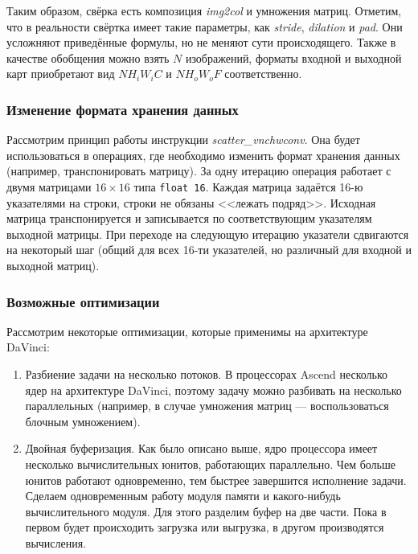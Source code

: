 Таким образом, свёрка есть композиция \textit{img2col} и умножения матриц.
Отметим, что в реальности свёртка имеет такие параметры, как
\textit{stride}, \textit{dilation} и \textit{pad}. Они усложняют
приведённые формулы, но не меняют сути происходящего. Также в
качестве обобщения можно взять $N$ изображений, форматы входной и
выходной карт приобретают вид $N H_i W_i C$ и $N H_o W_o F$ соответственно.

\subsubsection{Изменение формата хранения данных}

Рассмотрим принцип работы инструкции \textit{scatter\_vnchwconv}. Она будет
использоваться в операциях, где необходимо изменить формат хранения данных
(например, транспонировать матрицу). За одну итерацию операция работает с
двумя матрицами $16 \times 16$ типа \texttt{float 16}. Каждая матрица задаётся
16-ю указателями на строки, строки не обязаны <<лежать подряд>>. Исходная
матрица транспонируется и записывается по соответствующим указателям выходной
матрицы. При переходе на следующую итерацию указатели сдвигаются на некоторый
шаг (общий для всех 16-ти указателей, но различный для входной и выходной
матриц).

\subsubsection{Возможные оптимизации}
\label{subsubsec:Opt}

Рассмотрим некоторые оптимизации, которые применимы на архитектуре DaVinci:

\begin{enumerate}
    \item Разбиение задачи на несколько потоков. В процессорах Ascend несколько
          ядер на архитектуре DaVinci, поэтому задачу можно разбивать на
          несколько параллельных (например, в случае умножения матриц ---
          воспользоваться блочным умножением).
    
    \item Двойная буферизация. Как было описано выше, ядро процессора имеет
          несколько вычислительных юнитов, работающих параллельно. Чем больше
          юнитов работают одновременно, тем быстрее завершится исполнение
          задачи. Сделаем одновременным работу модуля памяти и какого-нибудь
          вычислительного модуля. Для этого разделим буфер на две части. Пока
          в первом будет происходить загрузка или выгрузка, в другом
          производятся вычисления. 
\end{enumerate}

\newpage
